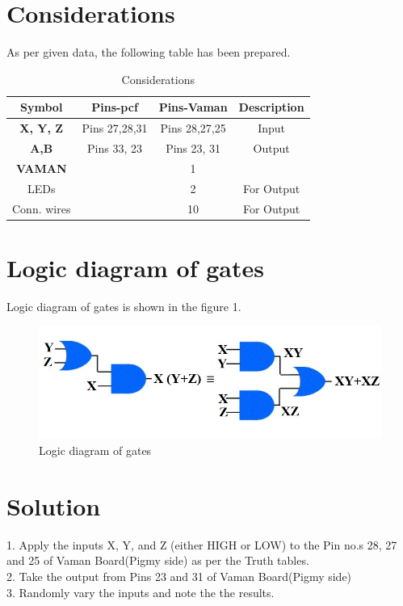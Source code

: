 \documentclass[journal,10pt,twocolumn]{article}
\begin{document}
\section{Considerations}
\vspace{0.2cm}
\begin{flushleft}
As per given data, the following table has been prepared.\\
\end{flushleft}
\vspace{0.3cm}
\begin{table}[htbp]
    \centering
\setlength\extrarowheight{2pt}
\begin{tabular}{|c|c|c|c|} \hline
      \textbf{Symbol}           &   \textbf{Pins-pcf} &   \textbf{Pins-Vaman}  & \textbf{Description}\\ \hline
	\textbf{X, Y, Z }&Pins 27,28,31& Pins 28,27,25 & Input\\  \hline
	\textbf{A,B} & Pins 33, 23 & Pins 23, 31 & Output\\ \hline
	\textbf{VAMAN} &  &1 & \\ \hline
    LEDs & &2 & For Output \\ \hline
 Conn. wires & & 10 & For Output \\ \hline
\end{tabular}
\caption{\label{tab:widgets}Considerations}
\end{table}

\section{Logic diagram of gates}
\vspace{0.25cm}
Logic diagram of gates is shown in the figure 1.
\begin{figure}[h]
\includegraphics[width=1\columnwidth]{Gates.jpg}
\caption{Logic diagram of gates}
\label{Logic diagram of gates}
\end{figure}
\section{Solution}
\begin{flushleft}
1. Apply the inputs X, Y, and Z (either HIGH or LOW) to the  Pin no.s 28, 27 and 25 of Vaman Board(Pigmy side) as per the Truth tables.\\
\vspace{0.25cm}
2. Take the output from Pins 23 and 31 of Vaman Board(Pigmy side)\\
\vspace{0.25cm}
3. Randomly vary the inputs and note the the results.
\end{flushleft}
\end{document}
